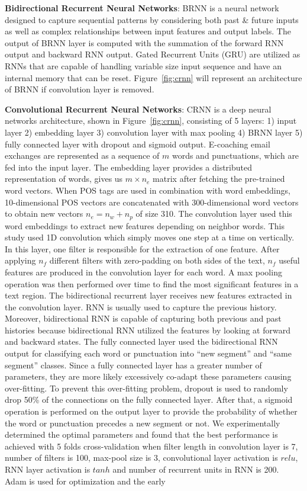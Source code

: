 \documentclass{amia}
\begin{document}
\textbf{Bidirectional Recurrent Neural Networks}: BRNN is a neural network designed to capture sequential patterns by considering both past \& future inputs as well as complex relationships between input features and output labels.\cite{schuster1997bidirectional} The output of BRNN layer is computed with the summation of the forward RNN output and backward RNN output. Gated Recurrent Units (GRU)\cite{chung2014empirical} are utilized as RNNs that are capable of handling variable size input sequence and have an internal memory that can be reset. Figure~\ref{fig:crnn} will represent an architecture of BRNN if convolution layer is removed.  

\textbf{Convolutional Recurrent Neural Networks}: CRNN is a deep neural networks architecture,\cite{treviso2017sentence} shown in Figure~\ref{fig:crnn}, consisting of 5 layers: 1) input layer 2) embedding layer 3) convolution layer with max pooling 4) BRNN layer 5) fully connected layer with dropout and sigmoid output. E-coaching email exchanges are represented as a sequence of $m$ words and punctuations, which are fed into the input layer. The embedding layer provides a distributed representation of words, gives us $m \times n_e$ matrix after fetching the pre-trained word vectors. When POS tags are used in combination with word embeddings, 10-dimensional POS vectors are concatenated with 300-dimensional word vectors to obtain new vectors $n_e = n_w + n_p$ of size 310. The convolution layer used this word embeddings to extract new features depending on neighbor words. This study used 1D convolution which simply moves one step at a time on vertically. In this layer, one filter is responsible for the extraction of one feature. After applying $n_f$ different filters with zero-padding on both sides of the text, $n_f$ useful features are produced in the convolution layer for each word. A max pooling operation was then performed over time to find the most significant features in a text region. The bidirectional recurrent layer receives new features extracted in the convolution layer. RNN is usually used to capture the previous history. Moreover, bidirectional RNN is capable of capturing both previous and past histories because bidirectional RNN utilized the features by looking at forward and backward states. The fully connected layer used the bidirectional RNN output for classifying each word or punctuation into ``new segment'' and ``same segment'' classes. Since a fully connected layer has a greater number of parameters, they are more likely excessively co-adapt these parameters causing over-fitting. To prevent this over-fitting problem, dropout is used to randomly drop 50\% of the connections on the fully connected layer. After that, a sigmoid operation is performed on the output layer to provide the probability of whether the word or punctuation precedes a new segment or not. We experimentally determined the optimal parameters and found that the best performance is achieved with 5 folds cross-validation when filter length in convolution layer is 7, number of filters is 100, max-pool size is 3, convolutional layer activation is $relu$, RNN layer activation is $tanh$ and number of recurrent units in RNN is 200. Adam\cite{kingma2014adam} is used for optimization and the early 
\end{document}
